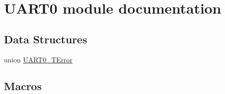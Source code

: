 \hypertarget{group___u_a_r_t0__module}{}\section{U\+A\+R\+T0 module documentation}
\label{group___u_a_r_t0__module}
\subsection*{Data Structures}
\begin{DoxyCompactItemize}
\item 
union \hyperlink{union_u_a_r_t0___t_error}{U\+A\+R\+T0\+\_\+\+T\+Error}
\end{DoxyCompactItemize}
\subsection*{Macros}
